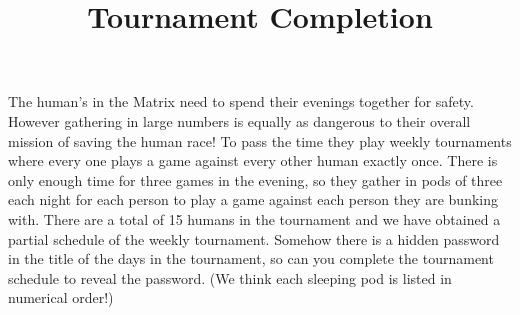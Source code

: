 \documentclass[12pt]{amsart}
\theoremstyle{definition}
\begin{document}
\title{Tournament Completion}

\maketitle

\thispagestyle{empty}

The human's in the Matrix need to spend their evenings together for safety. However gathering in large numbers is equally as dangerous to their overall mission of saving the human race! To pass the time they play weekly tournaments where every one plays a game against every other human exactly once. There is only enough time for three games in the evening, so they gather in pods of three each night for each person to play a game against each person they are bunking with. There are a total of 15 humans in the tournament and we have obtained a partial schedule of the weekly tournament. Somehow there is a hidden password in the title of the days in the tournament, so can you complete the tournament schedule to reveal the password. (We think each sleeping pod is listed in numerical order!)
\end{document}
